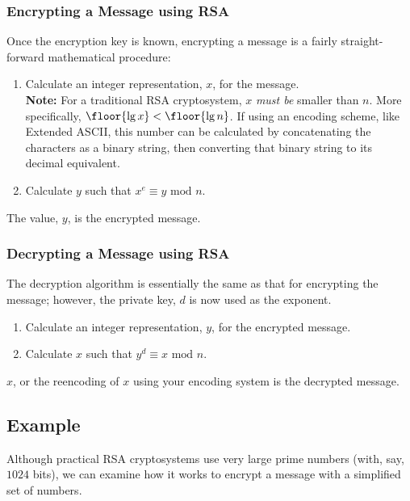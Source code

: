			\subsubsection*{Encrypting a Message using RSA}
				Once the encryption key is known, encrypting a message is a fairly straight-forward mathematical procedure:
					\begin{enumerate}
						\item Calculate an integer representation, $x$, for the message.\\
						{\small\textbf{Note:} For a traditional RSA cryptosystem, $x$ \emph{must be} smaller than $n$. More specifically, $\floor{\lg x} < \floor{\lg n}$. If using an encoding scheme, like Extended ASCII, this number can be calculated by concatenating the characters as a binary string, then converting that binary string to its decimal equivalent.}
						\item Calculate $y$ such that $x^{e} \equiv y\text{ mod } n$.
					\end{enumerate}
				The value, $y$, is the encrypted message.

			\subsubsection*{Decrypting a Message using RSA}
				The decryption algorithm is essentially the same as that for encrypting the message; however, the private key, $d$ is now used as the exponent.
					\begin{enumerate}
						\item Calculate an integer representation, $y$, for the encrypted message.
						\item Calculate $x$ such that $y^{d} \equiv x\text{ mod } n$.
					\end{enumerate}
				$x$, or the reencoding of $x$ using your encoding system is the decrypted message.

		\subsection{Example}
			Although practical RSA cryptosystems use very large prime numbers (with, say, $1024$ bits), we can examine how it works to encrypt a message with a simplified set of numbers.\\

